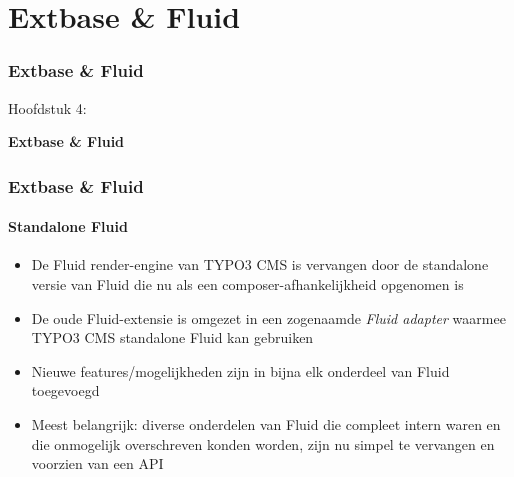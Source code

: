 %

\section{Extbase \& Fluid}
\begin{frame}[fragile]
	\frametitle{Extbase \& Fluid}

	\begin{center}\huge{Hoofdstuk 4:}\end{center}
	\begin{center}\huge{\color{typo3darkgrey}\textbf{Extbase \& Fluid}}\end{center}

\end{frame}


\begin{frame}[fragile]
	\frametitle{Extbase \& Fluid}
	\framesubtitle{Standalone Fluid}

	\lstset{basicstyle=\tiny\ttfamily}

	\begin{itemize}

		\item De Fluid render-engine van TYPO3 CMS is vervangen door de standalone
			versie van Fluid die nu als een composer-afhankelijkheid opgenomen is

		\item De oude Fluid-extensie is omgezet in een zogenaamde \textit{Fluid adapter}
			waarmee TYPO3 CMS standalone Fluid kan gebruiken

		\item Nieuwe features/mogelijkheden zijn in bijna elk onderdeel van Fluid toegevoegd

		\item Meest belangrijk: diverse onderdelen van Fluid die compleet intern waren en die
			onmogelijk overschreven konden worden, zijn nu simpel te vervangen en 
			voorzien van een API

	\end{itemize}

\end{frame}

